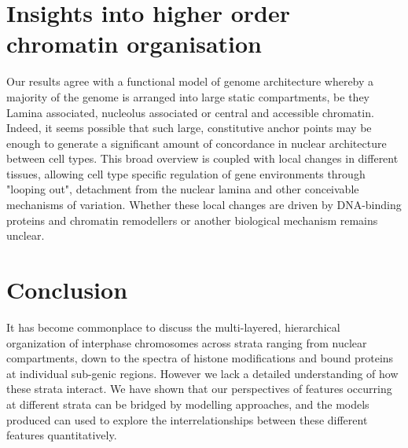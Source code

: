 \documentclass[a4paper,11pt,oneside]{book}
\begin{document}
\section{Insights into higher order chromatin organisation}


Our results agree with a functional model of genome architecture whereby a majority of the genome is arranged into large static compartments, be they Lamina associated, nucleolus associated or central and accessible chromatin. Indeed, it seems possible that such large, constitutive anchor points may be enough to generate a significant amount of concordance in nuclear architecture between cell types.\cite{Bouwman2015a} This broad overview is  coupled with local changes in different tissues, allowing cell type specific regulation of gene environments through "looping out", detachment from the nuclear lamina and other conceivable mechanisms of variation. Whether these local changes are driven by DNA-binding proteins and chromatin remodellers or another biological mechanism remains unclear.

\section{Conclusion}

It has become commonplace to discuss the multi-layered, hierarchical
organization of interphase chromosomes across strata ranging from
nuclear compartments, down to the spectra of histone modifications and
bound proteins at individual sub-genic regions. However we lack a
detailed understanding of how these strata interact. We have shown
that our perspectives of features occurring at different strata can be
bridged by modelling approaches, and the models produced can used to
explore the interrelationships between these different features
quantitatively. 
\end{document}

